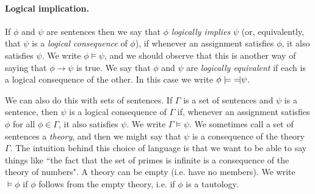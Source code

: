\documentclass{article}
\theoremstyle{plain}
\newcommand{\lequiv}{\models\text{\reflectbox{$\models$}}}
\newcommand{\ra}{\rightarrow}
\begin{document}
\paragraph{Logical implication.} If $\phi$ and $\psi$ are sentences then we say that $\phi$ \emph{logically implies} $\psi$ (or, equivalently, that $\psi$ is a \emph{logical consequence} of $\phi$), if whenever an assignment satisfies $\phi$, it also satisfies $\psi$. We write $\phi\models \psi$, and we should observe that this is another way of saying that $\phi\ra\psi$ is true. We say that $\phi$ and $\psi$ are \emph{logically equivalent} if each is a logical consequence of the other. In this case we write $\phi \lequiv \psi$. 

We can also do this with sets of sentences. If $\Gamma$ is a set of sentences and $\psi$ is a sentence, then $\psi$ is a logical consequence of $\Gamma$ if, whenever an assignment satisfies $\phi$ for all $\phi\in\Gamma$, it also satisfies $\psi$. We write $\Gamma\models \psi$. We sometimes call a set of sentences a \emph{theory}, and then we might say that $\psi$ is a consequence of the theory $\Gamma$. The intuition behind this choice of language is that we want to be able to say things like ``the fact that the set of primes is infinite is a consequence of the theory of numbers". A theory can be empty (i.e. have no members). We write $\models \phi$ if $\phi$ follows from the empty theory, i.e. if $\phi$ is a tautology. 
\end{document}
